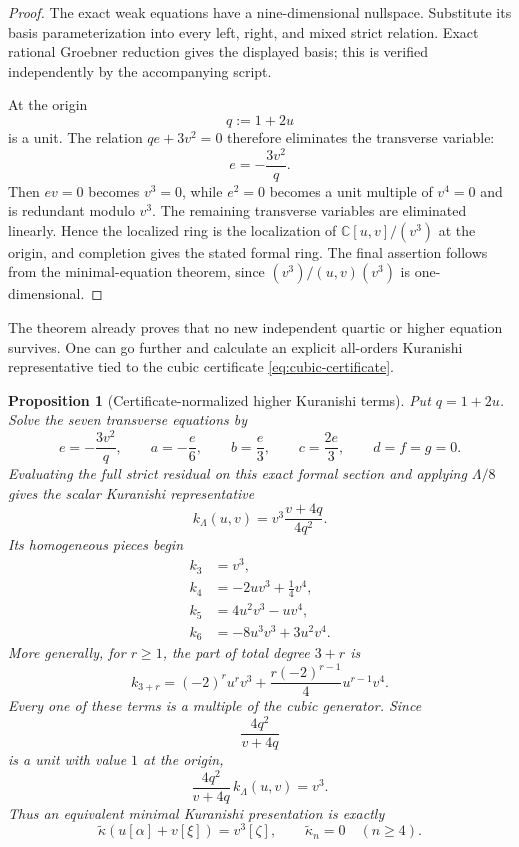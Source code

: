 \documentclass[11pt]{amsart}
\newtheorem{proposition}[theorem]{Proposition}
\newcommand{\C}{\mathbb C}
\begin{document}
\begin{proof}
The exact weak equations have a nine-dimensional nullspace.  Substitute its basis parameterization into every left, right, and mixed strict relation.  Exact rational Groebner reduction gives the displayed basis; this is verified independently by the accompanying script.

At the origin
\[
q:=1+2u
\]
is a unit.  The relation $qe+3v^2=0$ therefore eliminates the transverse variable:
\[
e=-\frac{3v^2}{q}.
\]
Then $ev=0$ becomes $v^3=0$, while $e^2=0$ becomes a unit multiple of $v^4=0$ and is redundant modulo $v^3$.  The remaining transverse variables are eliminated linearly.  Hence the localized ring is the localization of $\C[u,v]/(v^3)$ at the origin, and completion gives the stated formal ring.  The final assertion follows from the minimal-equation theorem, since $(v^3)/(u,v)(v^3)$ is one-dimensional.
\end{proof}

The theorem already proves that no new independent quartic or higher equation survives.  One can go further and calculate an explicit all-orders Kuranishi representative tied to the cubic certificate \eqref{eq:cubic-certificate}.

\begin{proposition}[Certificate-normalized higher Kuranishi terms]\label{prop:cubic-higher-tail}
Put $q=1+2u$.  Solve the seven transverse equations by
\[
e=-\frac{3v^2}{q},
\qquad
a=-\frac e6,
\qquad b=\frac e3,
\qquad c=\frac{2e}{3},
\qquad d=f=g=0.
\]
Evaluating the full strict residual on this exact formal section and applying $\Lambda/8$ gives the scalar Kuranishi representative
\[
\boxed{
 k_\Lambda(u,v)
 =
 v^3\frac{v+4q}{4q^2}.
}
\]
Its homogeneous pieces begin
\begin{align*}
k_3&=v^3,\\
k_4&=-2uv^3+\frac14v^4,\\
k_5&=4u^2v^3-uv^4,\\
k_6&=-8u^3v^3+3u^2v^4.
\end{align*}
More generally, for $r\ge1$, the part of total degree $3+r$ is
\[
\boxed{
 k_{3+r}
 =
 (-2)^r u^r v^3
 +\frac{r(-2)^{r-1}}{4}u^{r-1}v^4.
}
\]
Every one of these terms is a multiple of the cubic generator.  Since
\[
\frac{4q^2}{v+4q}
\]
is a unit with value $1$ at the origin,
\[
\frac{4q^2}{v+4q}\,k_\Lambda(u,v)=v^3.
\]
Thus an equivalent minimal Kuranishi presentation is exactly
\[
\boxed{
\widetilde\kappa(u[\alpha]+v[\xi])=v^3[\zeta],
\qquad
\widetilde\kappa_n=0\quad(n\ge4).
}
\]
\end{proposition}
\end{document}
